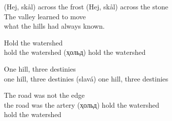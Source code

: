 \begin{lyrics}
(Hej, skål) across the frost
(Hej, skål) across the stone\\
The valley learned to move\\
what the hills had always known.

Hold the watershed\\
hold the watershed
(ҳольд) hold the watershed

One hill, three destinies\\
one hill, three destinies
(slavá) one hill, three destinies

The road was not the edge\\
the road was the artery
(ҳольд) hold the watershed\\
hold the watershed
\end{lyrics}


